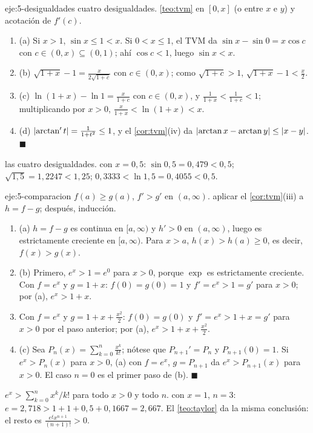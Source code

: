 \begin{solucion}{eje:5-desigualdades}
\datos cuatro desigualdades.
\planteamiento \cref{teo:tvm} en $[0,x]$ (o entre $x$ e $y$) y acotación de $f'(c)$.
\pasos
\begin{enumerate}[label=\arabic*.]
  \item (a) Si $x>1$, $\sin x\le1<x$. Si $0<x\le1$, el TVM da $\sin x-\sin0=x\cos c$ con $c\in(0,x)\subseteq(0,1)$; ahí $\cos c<1$, luego $\sin x<x$.
  \item (b) $\sqrt{1+x}-1=\frac{x}{2\sqrt{1+c}}$ con $c\in(0,x)$; como $\sqrt{1+c}>1$, $\sqrt{1+x}-1<\frac x2$.
  \item (c) $\ln(1+x)-\ln1=\frac{x}{1+c}$ con $c\in(0,x)$, y $\frac{1}{1+x}<\frac{1}{1+c}<1$; multiplicando por $x>0$, $\frac{x}{1+x}<\ln(1+x)<x$.
  \item (d) $\lvert\arctan't\rvert=\frac{1}{1+t^{2}}\le1$, y el \cref{cor:tvm}(iv) da $\lvert\arctan x-\arctan y\rvert\le\lvert x-y\rvert$. \hfill$\blacksquare$
\end{enumerate}
\resultado las cuatro desigualdades.
\comprobacion con $x=0{,}5$: $\sin0{,}5=0{,}479<0{,}5$; $\sqrt{1{,}5}=1{,}2247<1{,}25$; $0{,}3333<\ln1{,}5=0{,}4055<0{,}5$.
\end{solucion}

\begin{solucion}{eje:5-comparacion}
\datos $f(a)\ge g(a)$, $f'>g'$ en $(a,\infty)$.
\planteamiento aplicar el \cref{cor:tvm}(iii) a $h=f-g$; después, inducción.
\pasos
\begin{enumerate}[label=\arabic*.]
  \item (a) $h=f-g$ es continua en $[a,\infty)$ y $h'>0$ en $(a,\infty)$, luego es estrictamente creciente en $[a,\infty)$. Para $x>a$, $h(x)>h(a)\ge0$, es decir, $f(x)>g(x)$.
  \item (b) Primero, $e^{x}>1=e^{0}$ para $x>0$, porque $\exp$ es estrictamente creciente. Con $f=e^{x}$ y $g=1+x$: $f(0)=g(0)=1$ y $f'=e^{x}>1=g'$ para $x>0$; por (a), $e^{x}>1+x$.
  \item Con $f=e^{x}$ y $g=1+x+\frac{x^{2}}{2}$: $f(0)=g(0)$ y $f'=e^{x}>1+x=g'$ para $x>0$ por el paso anterior; por (a), $e^{x}>1+x+\frac{x^{2}}{2}$.
  \item (c) Sea $P_n(x)=\sum_{k=0}^{n}\frac{x^{k}}{k!}$; nótese que $P_{n+1}'=P_n$ y $P_{n+1}(0)=1$. Si $e^{x}>P_n(x)$ para $x>0$, (a) con $f=e^{x}$, $g=P_{n+1}$ da $e^{x}>P_{n+1}(x)$ para $x>0$. El caso $n=0$ es el primer paso de (b). \hfill$\blacksquare$
\end{enumerate}
\resultado $e^{x}>\sum_{k=0}^{n}x^{k}/k!$ para todo $x>0$ y todo $n$.
\comprobacion con $x=1$, $n=3$: $e=2{,}718>1+1+0{,}5+0{,}1667=2{,}667$. El \cref{teo:taylor} da la misma conclusión: el resto es $\frac{e^{\xi}x^{n+1}}{(n+1)!}>0$.
\end{solucion}

